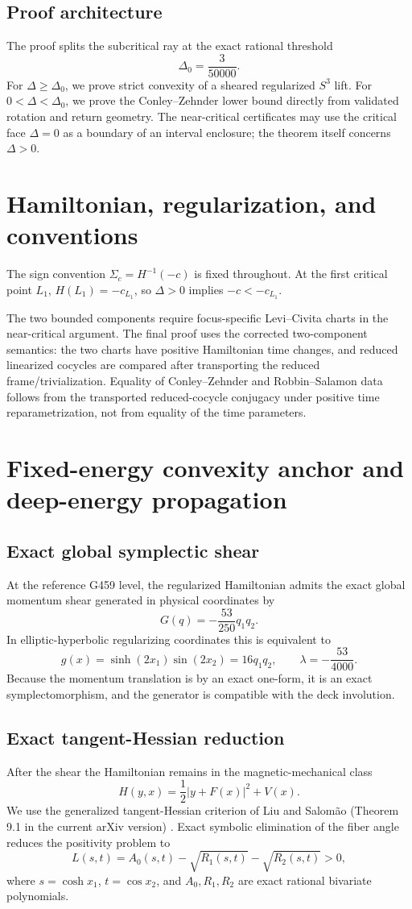\documentclass[11pt]{article}
\begin{document}
\subsection{Proof architecture}
The proof splits the subcritical ray at the exact rational threshold
\[
\Delta_0=\frac{3}{50000}.
\]
For $\Delta\ge\Delta_0$, we prove strict convexity of a sheared regularized $S^3$ lift. For $0<\Delta<\Delta_0$, we prove the Conley--Zehnder lower bound directly from validated rotation and return geometry. The near-critical certificates may use the critical face $\Delta=0$ as a boundary of an interval enclosure; the theorem itself concerns $\Delta>0$.

\section{Hamiltonian, regularization, and conventions}
The sign convention $\Sigma_c=H^{-1}(-c)$ is fixed throughout. At the first critical point $L_1$, $H(L_1)=-c_{L_1}$, so $\Delta>0$ implies $-c<-c_{L_1}$.

The two bounded components require focus-specific Levi--Civita charts in the near-critical argument. The final proof uses the corrected two-component semantics: the two charts have positive Hamiltonian time changes, and reduced linearized cocycles are compared after transporting the reduced frame/trivialization. Equality of Conley--Zehnder and Robbin--Salamon data follows from the transported reduced-cocycle conjugacy under positive time reparametrization, not from equality of the time parameters.

\section{Fixed-energy convexity anchor and deep-energy propagation}
\subsection{Exact global symplectic shear}
At the reference G459 level, the regularized Hamiltonian admits the exact global momentum shear generated in physical coordinates by
\[
G(q)=-\frac{53}{250}q_1q_2.
\]
In elliptic-hyperbolic regularizing coordinates this is equivalent to
\[
g(x)=\sinh(2x_1)\sin(2x_2)=16q_1q_2,
\qquad \lambda=-\frac{53}{4000}.
\]
Because the momentum translation is by an exact one-form, it is an exact symplectomorphism, and the generator is compatible with the deck involution.

\subsection{Exact tangent-Hessian reduction}
After the shear the Hamiltonian remains in the magnetic-mechanical class
\[
H(y,x)=\frac12\lvert y+F(x)\rvert^2+V(x).
\]
We use the generalized tangent-Hessian criterion of Liu and Salom\~ao (Theorem 9.1 in the current arXiv version) \citep{LiuSalomao2025}. Exact symbolic elimination of the fiber angle reduces the positivity problem to
\[
L(s,t)=A_0(s,t)-\sqrt{R_1(s,t)}-\sqrt{R_2(s,t)}>0,
\]
where $s=\cosh x_1$, $t=\cos x_2$, and $A_0,R_1,R_2$ are exact rational bivariate polynomials.
\end{document}

